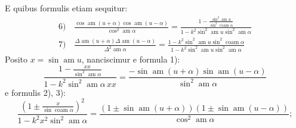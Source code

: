 \documentclass{article}
\begin{document}
E quibus formulis etiam sequitur:
\[
\begin{gathered}
\text{6)}\quad\frac{\cos\operatorname{am}(u+\alpha)\cos\operatorname{am}(u-\alpha)}{\cos^{2}\operatorname{am}\alpha}=\frac{1-\frac{\sin^{2}\operatorname{am}u}{\sin^{2}\operatorname{coam}\alpha}}{1-k^{2}\sin^{2}\operatorname{am}u\sin^{2}\operatorname{am}\alpha}\\[1.5ex]
\text{7)}\quad\frac{\Delta\operatorname{am}(u+\alpha)\Delta\operatorname{am}(u-\alpha)}{\Delta^{2}\operatorname{am}\alpha}=\frac{1-k^{2}\sin^{2}\operatorname{am}u\sin^{2}\operatorname{coam}\alpha}{1-k^{2}\sin^{2}\operatorname{am}u\sin^{2}\operatorname{am}\alpha}
\end{gathered}
\]
Posito $x=\sin\operatorname{am}u$, nanciscimur e formula 1):
\[
\frac{1-\frac{xx}{\sin^{2}\operatorname{am}\alpha}}{1-k^{2}\sin^{2}\operatorname{am}\alpha\,xx}=\frac{-\sin\operatorname{am}(u+\alpha)\sin\operatorname{am}(u-\alpha)}{\sin^{2}\operatorname{am}\alpha}
\]
e formulis 2), 3):
\[
\frac{\left(1\pm\frac{x}{\sin\operatorname{coam}\alpha}\right)^{2}}{1-k^{2}x^{2}\sin^{2}\operatorname{am}\alpha}=\frac{\left(1\pm\sin\operatorname{am}(u+\alpha)\right)\left(1\pm\sin\operatorname{am}(u-\alpha)\right)}{\cos^{2}\operatorname{am}\alpha};
\]
\end{document}
